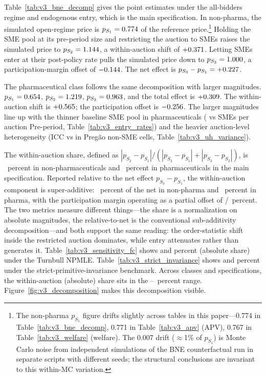 Table~\ref{tab:v3_bne_decomp} gives the point estimates under the all-bidders regime and endogenous entry, which is the main specification. In non-pharma, the simulated open-regime price is $p_{S_1} = 0.774$ of the reference price.\footnote{The non-pharma $p_{S_1}$ figure drifts slightly across tables in this paper---0.774 in Table~\ref{tab:v3_bne_decomp}, 0.771 in Table~\ref{tab:v3_apv} (APV), 0.767 in Table~\ref{tab:v3_welfare} (welfare). The 0.007 drift ($\approx$1\% of $p_{S_1}$) is Monte Carlo noise from independent simulations of the BNE counterfactual run in separate scripts with different seeds; the structural conclusions are invariant to this within-MC variation.} Holding the SME pool at its pre-period size and restricting the auction to SMEs raises the simulated price to $p_{S_2} = 1.144$, a within-auction shift of $+0.371$. Letting SMEs enter at their post-policy rate pulls the simulated price down to $p_{S_3} = 1.000$, a participation-margin offset of $-0.144$. The net effect is $p_{S_3} - p_{S_1} = +0.227$.

The pharmaceutical class follows the same decomposition with larger magnitudes. $p_{S_1} = 0.654$, $p_{S_2} = 1.219$, $p_{S_3} = 0.963$, and the total effect is $+0.309$. The within-auction shift is $+0.565$; the participation offset is $-0.256$. The larger magnitudes line up with the thinner baseline SME pool in pharmaceuticals (\bneNsmePrePh{} vs \bneNsmePreNp{} SMEs per auction Pre-period, Table~\ref{tab:v3_entry_rates}) and the heavier auction-level heterogeneity (ICC \iccDecompContrastPh{} vs \iccDecompContrastNp{} in Preg\~ao non-SME cells, Table~\ref{tab:v3_uh_variance}).

The within-auction share, defined as $|p_{S_2} - p_{S_1}| / (|p_{S_2} - p_{S_1}| + |p_{S_3} - p_{S_2}|)$, is \bneShareIntensNp~percent in non-pharmaceuticals and \bneShareIntensPh~percent in pharmaceuticals in the main specification. Reported relative to the net effect $p_{S_3} - p_{S_1}$, the within-auction component is super-additive: \bneIntensRelNetNp~percent of the net in non-pharma and \bneIntensRelNetPh~percent in pharma, with the participation margin operating as a partial offset of \bneEntryRelNetNp/\bneEntryRelNetPh~percent. The two metrics measure different things---the share is a normalization on absolute magnitudes, the relative-to-net is the conventional sub-additivity decomposition---and both support the same reading: the order-statistic shift inside the restricted auction dominates, while entry attenuates rather than generates it. Table~\ref{tab:v3_sensitivity_fc} shows \turnbullShareNp{} and \turnbullSharePh{} percent (absolute share) under the Turnbull NPMLE. Table~\ref{tab:v3_strict_invariance} shows \strictShareNp{} and \strictSharePh{} percent under the strict-primitive-invariance benchmark. Across classes and specifications, the within-auction (absolute) share sits in the \withinShareLow--\withinShareHigh~percent range. Figure~\ref{fig:v3_decomposition} makes this decomposition visible.

